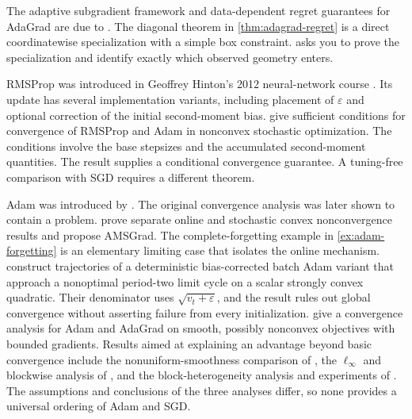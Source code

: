 \documentclass[11pt,twoside]{article}
\theoremstyle{definition}
\theoremstyle{remark}
\begin{document}
The adaptive subgradient framework and data-dependent regret guarantees for
AdaGrad are due to \citet{duchi2011}. The diagonal theorem in
\cref{thm:adagrad-regret} is a direct coordinatewise specialization with a
simple box constraint.  asks you to prove the
specialization and identify exactly which observed geometry enters.

RMSProp was introduced in Geoffrey Hinton's 2012 neural-network course
\citep{hinton2012rmsprop}. Its update has several implementation variants,
including placement of
$\varepsilon$ and optional correction of the initial second-moment bias.
\citet{zou2019} give sufficient conditions for convergence of RMSProp and
Adam in nonconvex stochastic optimization. The conditions involve the base
stepsizes and the accumulated second-moment quantities. The result supplies a
conditional convergence guarantee. A tuning-free comparison with SGD requires
a different theorem.

Adam was introduced by \citet{kingma2015}. The original convergence analysis
was later shown to contain a problem. \citet{reddi2018} prove separate online
and stochastic convex nonconvergence results and propose AMSGrad. The
complete-forgetting example in \cref{ex:adam-forgetting} is an elementary
limiting case that isolates the online mechanism. \citet{bock2022} construct
trajectories of a deterministic bias-corrected batch Adam variant that
approach a nonoptimal period-two limit cycle on a scalar strongly convex
quadratic. Their denominator uses $\sqrt{v_t+\varepsilon}$, and the result
rules out global convergence without asserting failure from every
initialization. \citet{defossez2022}
give a convergence analysis for Adam and AdaGrad on smooth, possibly
nonconvex objectives with bounded gradients. Results aimed at explaining an
advantage beyond basic convergence include the nonuniform-smoothness
comparison of \citet{wang2024}, the $\ell_\infty$ and blockwise analysis of
\citet{xie2025}, and the block-heterogeneity analysis and experiments of
\citet{zhang2024transformers}. The assumptions and conclusions of the three
analyses differ, so none provides a universal ordering of Adam and SGD.
\end{document}

